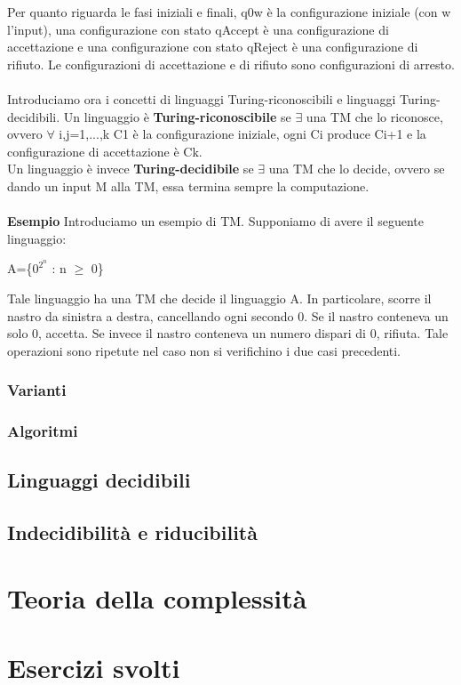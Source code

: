 \documentclass[]{article}
\begin{document}
			Per quanto riguarda le fasi iniziali e finali, q0w è la configurazione iniziale (con w l'input), una configurazione con stato qAccept è una configurazione di accettazione e una configurazione con stato qReject è una configurazione di rifiuto. Le configurazioni di accettazione e di rifiuto sono configurazioni di arresto.\\\\
			Introduciamo ora i concetti di linguaggi Turing-riconoscibili e linguaggi Turing-decidibili. Un linguaggio è \textbf{Turing-riconoscibile} se $\exists$ una TM che lo riconosce, ovvero $\forall$ i,j=1,...,k C1 è la configurazione iniziale, ogni Ci produce Ci+1 e la configurazione di accettazione è Ck.\\ Un linguaggio è invece \textbf{Turing-decidibile} se $\exists$ una TM che lo decide, ovvero se dando un input M alla TM, essa termina sempre la computazione.\\\\
			\textbf{Esempio} Introduciamo un esempio di TM. Supponiamo di avere il seguente linguaggio:
			\begin{center}
				A=\{$0^{2^n}$ : n $\geq$ 0\}
			\end{center}
			Tale linguaggio ha una TM che decide il linguaggio A. In particolare, scorre il nastro da sinistra a destra, cancellando ogni secondo 0. Se il nastro conteneva un solo 0, accetta. Se invece il nastro conteneva un numero dispari di 0, rifiuta. Tale operazioni sono ripetute nel caso non si verifichino i due casi precedenti.
			\subsubsection{Varianti}
			\subsubsection{Algoritmi}
		\subsection{Linguaggi decidibili}
		\subsection{Indecidibilità e riducibilità}
	\section{Teoria della complessità}
	\section{Esercizi svolti}
		
		
		
		
		
		
\end{document}
